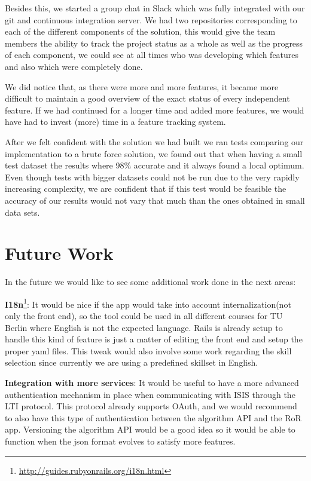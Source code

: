 Besides this, we started a group chat in Slack which was fully integrated with our git and continuous integration server. We had two repositories corresponding to each of the different components of the solution, this would give the team members the ability to track the project status as a whole as well as the progress of each component, we could see at all times who was developing which features and also which were completely done. 

We did notice that, as there were more and more features, it became more difficult to maintain a good overview of the exact status of every independent feature. If we had continued for a longer time and added more features, we would have had to invest (more) time in a feature tracking system.

After we felt confident with the solution we had built we ran tests comparing our implementation to a brute force solution, we found out that when having a small test dataset the results where 98\% accurate and it always found a local optimum. Even though tests with bigger datasets could not be run due to the very rapidly increasing complexity, we are confident that if this test would be feasible the accuracy of our results would not vary that much than the ones obtained in small data sets.

\section{Future Work}
In the future we would like to see some additional work done in the next areas:

\textbf{I18n}\footnote{\url{http://guides.rubyonrails.org/i18n.html}}: It would be nice if the app would take into account internalization(not only the front end), so the tool could be used in all different courses for TU Berlin where English is not the expected language. Rails is already setup to handle this kind of feature is just a matter of editing the front end and setup the proper yaml files. This tweak would also involve some work regarding the skill selection since currently we are using a predefined skillset in English.

\textbf{Integration with more services}: It would be useful to have a more advanced authentication mechanism in place when communicating with ISIS through the LTI protocol. This protocol already supports OAuth, and we would recommend to also have this type of authentication between the algorithm API and the RoR app. Versioning the algorithm API would be a good idea so it would be able to function when the json format evolves to satisfy more features.
 
